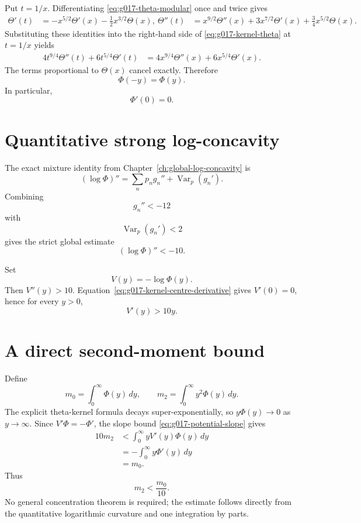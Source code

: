 Put $t=1/x$.  Differentiating \cref{eq:g017-theta-modular} once and twice
gives
\begin{align}
 \Theta'(t)
 &=-x^{5/2}\Theta'(x)-\frac12x^{3/2}\Theta(x),
 \label{eq:g017-theta-first}\
 \Theta''(t)
 &=x^{9/2}\Theta''(x)
   +3x^{7/2}\Theta'(x)
   +\frac34x^{5/2}\Theta(x).
 \label{eq:g017-theta-second}
\end{align}
Substituting these identities into the right-hand side of
\cref{eq:g017-kernel-theta} at $t=1/x$ yields
\begin{align*}
4t^{9/4}\Theta''(t)+6t^{5/4}\Theta'(t)
&=4x^{9/4}\Theta''(x)+6x^{5/4}\Theta'(x).
\end{align*}
The terms proportional to $\Theta(x)$ cancel exactly. Therefore
\begin{equation}
 \boxed{\Phi(-y)=\Phi(y).}
 \label{eq:g017-kernel-even}
\end{equation}
In particular,
\begin{equation}
 \boxed{\Phi'(0)=0.}
 \label{eq:g017-kernel-centre-derivative}
\end{equation}

\section{Quantitative strong log-concavity}

The exact mixture identity from Chapter~\ref{ch:global-log-concavity} is
\[
 (\log\Phi)''
 =\sum_n p_ng_n''+\operatorname{Var}_p(g_n').
\]
Combining
\[
 g_n''<-12
\]
with
\[
 \operatorname{Var}_p(g_n')<2
\]
gives the strict global estimate
\begin{equation}
 \boxed{(\log\Phi)''<-10.}
 \label{eq:g017-strong-log-concavity}
\end{equation}

Set
\[
 V(y)=-\log\Phi(y).
\]
Then $V''(y)>10$.  Equation~\eqref{eq:g017-kernel-centre-derivative}
gives $V'(0)=0$, hence for every $y>0$,
\begin{equation}
 \boxed{V'(y)>10y.}
 \label{eq:g017-potential-slope}
\end{equation}

\section{A direct second-moment bound}

Define
\[
 m_0=\int_0^\infty\Phi(y)\,dy,
 \qquad
 m_2=\int_0^\infty y^2\Phi(y)\,dy.
\]
The explicit theta-kernel formula decays super-exponentially, so
$y\Phi(y)\to0$ as $y\to\infty$. Since $V'\Phi=-\Phi'$, the slope bound
\cref{eq:g017-potential-slope} gives
\begin{align}
10m_2
&<\int_0^\infty yV'(y)\Phi(y)\,dy\\
&=-\int_0^\infty y\Phi'(y)\,dy\\
&=m_0.
\end{align}
Thus
\begin{equation}
 \boxed{m_2<\frac{m_0}{10}.}
 \label{eq:g017-moment-bound}
\end{equation}
No general concentration theorem is required; the estimate follows directly
from the quantitative logarithmic curvature and one integration by parts.

